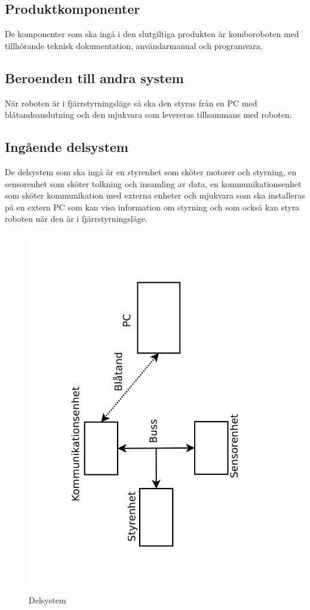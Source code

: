 \documentclass[a4paper,12pt]{article}
\begin{document}
\subsection{Produktkomponenter}
De komponenter som ska ingå i den slutgiltiga produkten är
komboroboten med tillhörande teknisk dokumentation, användarmanual och programvara.

\subsection{Beroenden till andra system}
När roboten är i fjärrstyrningsläge så ska den styras från en PC 
med blåtandsanslutning och den mjukvara som levereras tillsammans med roboten.

\subsection{Ingående delsystem}
De delsystem som ska ingå är en styrenhet som sköter motorer och styrning,
en sensorenhet som sköter tolkning och insamling av data,
en kommunikationsenhet som sköter kommunikation med externa enheter och mjukvara 
som ska installeras på en extern PC som kan visa information om 
styrning och som också kan styra roboten när den är i fjärrstyrningsläge.

\begin{figure}[h!]
	\caption{Delsystem}
	\begin{center}
		\includegraphics[scale=0.4,angle=270]{delsystem.pdf}
	\end{center}
\end{figure}
\end{document}
